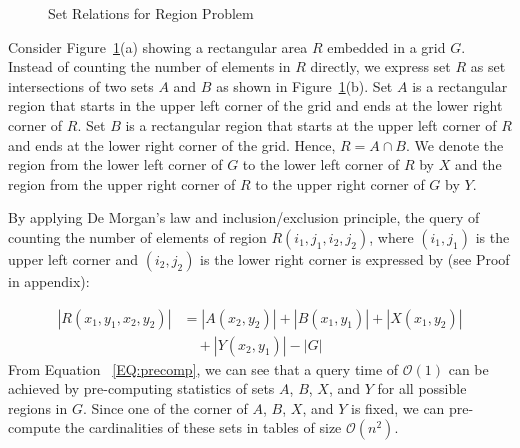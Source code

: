 \documentclass[AMA,LATO1COL]{WileyNJD-v2-bak}
\newcommand\bigo{\mathcal O}
\begin{document}
\begin{figure}[h]
     \begin{center}
\end{center}
\vspace{-10pt}
\caption{Set Relations for Region Problem}\label{fig:example}
\end{figure}

Consider Figure~\ref{fig:example}(a) showing a rectangular area $R$ embedded in a grid $G$. Instead of counting the number of elements in $R$ directly, we express set $R$ as set intersections of two sets $A$ and $B$ as shown in Figure~\ref{fig:example}(b). Set $A$ is a rectangular region that starts in the upper left corner of the grid and ends at the lower right corner of $R$. Set $B$ is a rectangular region that starts at the upper left corner of $R$ and ends at the lower right corner of the grid. Hence, $R=A \cap B$. We denote the region from the lower left corner of $G$ to the lower left corner of $R$ by $X$ and the region from the upper right corner of $R$ to the upper right corner of $G$ by $Y$.

 By applying De Morgan's law and inclusion/exclusion principle, the query of counting the number of elements of region $R(i_1,j_1,i_2,j_2)$, where $(i_1,j_1)$ is the upper left corner and $(i_2,j_2)$ is the lower right corner is expressed by (see Proof in appendix):

\small
\begin{equation}
\label{EQ:precomp}
\begin{split}
|R(x_1,y_1,x_2,y_2)|& = |A(x_2,y_2)| + |B(x_1,y_1)| + |X(x_1,y_2)| \\& \quad + |Y(x_2,y_1)| - |G|
\end{split}
\end{equation}
\normalsize
From Equation ~\ref{EQ:precomp}, we can see that a query time of $\bigo(1)$ can be achieved by pre-computing statistics of sets $A$, $B$, $X$, and $Y$ for all possible regions in $G$. Since one of the corner of $A$, $B$, $X$, and $Y$ is fixed, we can pre-compute the cardinalities of these sets in tables of size $\bigo(n^2)$.
\end{document}
